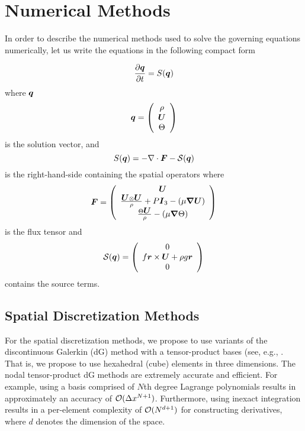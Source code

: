 
\section{Numerical Methods}
\label{sec:numerical_methods}

In order to describe the numerical methods used to solve the governing equations numerically, let us write the equations in the following compact form

\[
\frac{\partial \mbox{\boldmath$q$\unboldmath}}{\partial t} = S(\mbox{\boldmath$q$\unboldmath})
\]
where $\mbox{\boldmath$q$\unboldmath}$
\[
\mbox{\boldmath$q$\unboldmath}=\left( \begin{array}{c}
\rho \\
\mbox{\boldmath$U$\unboldmath} \\
\Theta
\end{array}
\right)
\]
 is the solution vector, 
 and 
 \[
 S(\mbox{\boldmath$q$\unboldmath}) = - \nabla \cdot \mbox{\boldmath$F$\unboldmath} - \mathcal{S}(\mbox{\boldmath$q$\unboldmath})
 \]
 is the right-hand-side containing the spatial operators where 
 \[
 \mbox{\boldmath$F$\unboldmath}=\left( \begin{array}{c}
 \mbox{\boldmath$U$\unboldmath} \\
 \frac{\mbox{\boldmath$U$\unboldmath} \otimes \mbox{\boldmath$U$\unboldmath}}{\rho} + P \mbox{\boldmath$I$\unboldmath}_3 - \left( \mu \mbox{\boldmath$\nabla$\unboldmath} \mbox{\boldmath$U$\unboldmath} \right) \\
\frac{\Theta \mbox{\boldmath$U$\unboldmath}}{\rho} - \left( \mu \mbox{\boldmath$\nabla$\unboldmath} \Theta \right)
\end{array}
\right)
 \]
 is the flux tensor and
 \[
 \mathcal{S}(\mbox{\boldmath$q$\unboldmath})=\left( \begin{array}{c}
 0 \\
 f \mbox{\boldmath$r$\unboldmath} \times \mbox{\boldmath$U$\unboldmath} + \rho g \mbox{\boldmath$r$\unboldmath} \\
0 
\end{array}
\right)
 \]
contains the source terms. 

\subsection{Spatial Discretization Methods}
For the spatial discretization methods, we propose to use variants of the discontinuous Galerkin (dG) method with a tensor-product bases (see, e.g., \cite{giraldo:2008a, abdi:2016}. That is, we propose to use hexahedral (cube) elements in three dimensions.  The nodal tensor-product dG methods are extremely accurate and efficient.  For example, using a basis comprised of $N$th degree Lagrange polynomials results in approximately an accuracy of $\mathcal{O}(\Delta x^{N+1})$. Furthermore, using inexact integration results in a per-element complexity of $\mathcal{O}(N^{d+1})$ for constructing derivatives, where $d$ denotes the dimension of the space. 

